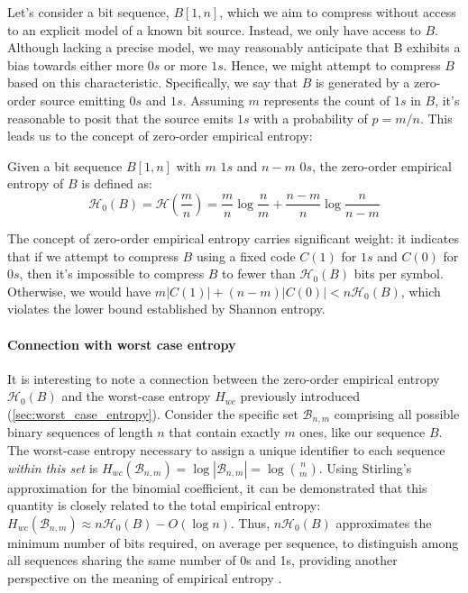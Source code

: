 Let's consider a bit sequence, $B[1, n]$, which we aim to compress without access to an explicit model of a known bit source. Instead, we only have access to $B$. Although lacking a precise model, we may reasonably anticipate that B exhibits a bias towards either more $0s$ or more $1s$. Hence, we might attempt to compress $B$ based on this characteristic. Specifically, we say that $B$ is generated by a zero-order source emitting $0s$ and $1s$. Assuming $m$ represents the count of $1s$ in $B$, it's reasonable to posit that the source emits $1s$ with a probability of $p = m/n$. This leads us to the concept of zero-order empirical entropy:

\begin{definition}
    Given a bit sequence $B[1, n]$ with $m$ $1s$ and $n-m$ $0s$, the zero-order empirical entropy of $B$ is defined as:
    \begin{equation}
        \mathcal{H}_0(B) = \mathcal{H} \left( \frac{m}{n} \right) =\frac{m}{n} \log \frac{n}{m} + \frac{n-m}{n} \log \frac{n}{n-m}
    \end{equation}
\end{definition}
\noindent The concept of zero-order empirical entropy carries significant weight: it indicates that if we attempt to compress $B$ using a fixed code $C(1)$ for $1s$ and $C(0)$ for $0s$, then it's impossible to compress $B$ to fewer than $\mathcal{H}_0(B)$ bits per symbol. Otherwise, we would have $m |C(1)| + (n-m) |C(0)| < n \mathcal{H}_0(B)$, which violates the lower bound established by Shannon entropy.

\paragraph{Connection with worst case entropy}
It is interesting to note a connection between the zero-order empirical entropy $\mathcal{H}_0(B)$ and the worst-case entropy $H_{wc}$ previously introduced (\autoref{sec:worst_case_entropy}). Consider the specific set $\mathcal{B}_{n,m}$ comprising all possible binary sequences of length $n$ that contain exactly $m$ ones, like our sequence $B$. The worst-case entropy necessary to assign a unique identifier to each sequence \emph{within this set} is $H_{wc}(\mathcal{B}_{n,m}) = \log |\mathcal{B}_{n,m}| = \log \binom{n}{m}$. Using Stirling's approximation for the binomial coefficient, it can be demonstrated that this quantity is closely related to the total empirical entropy: $H_{wc}(\mathcal{B}_{n,m}) \approx n \mathcal{H}_0(B) - O(\log n)$. Thus, $n \mathcal{H}_0(B)$ approximates the minimum number of bits required, on average per sequence, to distinguish among all sequences sharing the same number of 0s and 1s, providing another perspective on the meaning of empirical entropy \cite{navarro2016compact}.

